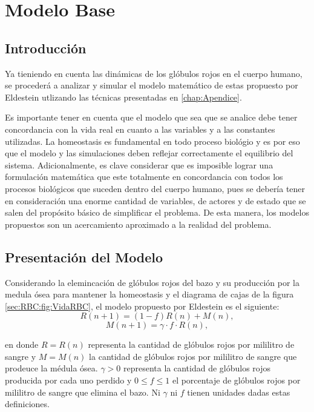 
\chapter{Modelo Base}\label{chap:modelo}
\section{Introducción}\label{sec:modelo:intro}
Ya tieniendo en cuenta las dinámicas de los glóbulos rojos en el cuerpo humano, se procederá a analizar y simular el modelo matemático de estas propuesto por Eldestein \cite{edelstein2005} utlizando las técnicas presentadas en \ref{chap:Apendice}. 

Es importante tener en cuenta que el modelo que sea que se analice debe tener concordancia con la vida real en cuanto a las variables y a las constantes utilizadas. La homeostasis es fundamental en todo proceso biológio y es por eso que el modelo y las simulaciones deben reflejar correctamente el equilibrio del sistema. Adicionalmente, es clave considerar que es imposible lograr una formulación matemática que este totalmente en concordancia con todos los procesos biológicos que suceden dentro del cuerpo humano, pues se debería tener en consideración una enorme cantidad de variables, de actores y de estado que se salen del propósito básico de simplificar el problema. De esta manera, los modelos propuestos son un acercamiento aproximado a la realidad del problema.

\section{Presentación del Modelo}\label{sec:modelo:presentacion}
Considerando la elemincación de glóbulos rojos del bazo y su producción por la medula ósea para mantener la homeostasis y el diagrama de cajas de la figura \ref{sec:RBC:fig:VidaRBC}, el modelo propuesto por Eldestein es el siguiente:
$$R(n+1)=(1-f)R(n)+M(n),$$
$$M(n+1)=\gamma \cdot f\cdot R(n),$$

en donde $R=R(n)$ representa la cantidad de glóbulos rojos por mililitro de sangre y $M=M(n)$ la cantidad de glóbulos rojos por mililitro de sangre que prodeuce la médula ósea. $\gamma>0$ representa la cantidad de glóbulos rojos producida por cada uno perdido y $0\leq f \leq 1$ el porcentaje de glóbulos rojos por mililitro de sangre que elimina el bazo. Ni $\gamma$ ni $f$ tienen unidades dadas estas definiciones.

